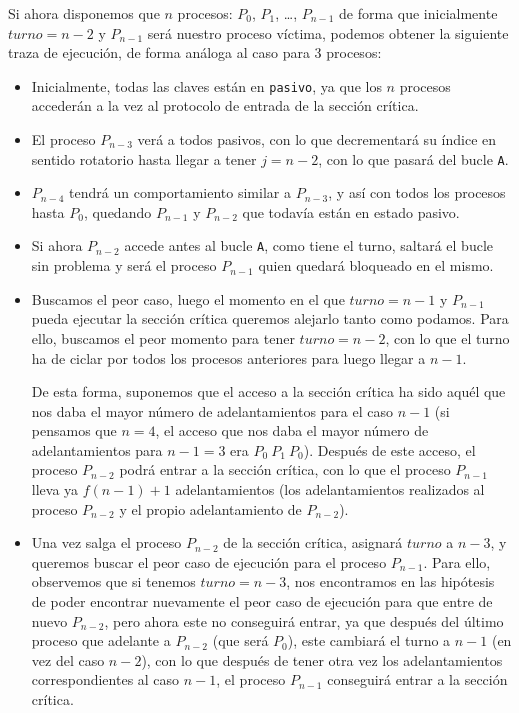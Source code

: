 \begin{description}
        Si ahora disponemos que $n$ procesos: $P_0$, $P_1$, \ldots, $P_{n-1}$ de forma que inicialmente $turno = n-2$ y $P_{n-1}$ será nuestro proceso víctima, podemos obtener la siguiente traza de ejecución, de forma análoga al caso para 3 procesos:
        \begin{itemize}
            \item Inicialmente, todas las claves están en \verb|pasivo|, ya que los $n$ procesos accederán a la vez al protocolo de entrada de la sección crítica.
            \item El proceso $P_{n-3}$ verá a todos pasivos, con lo que decrementará su índice en sentido rotatorio hasta llegar a tener $j = n-2$, con lo que pasará del bucle \verb|A|.
            \item $P_{n-4}$ tendrá un comportamiento similar a $P_{n-3}$, y así con todos los procesos hasta $P_0$, quedando $P_{n-1}$ y $P_{n-2}$ que todavía están en estado pasivo.
            \item Si ahora $P_{n-2}$ accede antes al bucle \verb|A|, como tiene el turno, saltará el bucle sin problema y será el proceso $P_{n-1}$ quien quedará bloqueado en el mismo.
            \item Buscamos el peor caso, luego el momento en el que $turno = n-1$ y $P_{n-1}$ pueda ejecutar la sección crítica queremos alejarlo tanto como podamos. Para ello, buscamos el peor momento para tener $turno = n-2$, con lo que el turno ha de ciclar por todos los procesos anteriores para luego llegar a $n-1$.

                De esta forma, suponemos que el acceso a la sección crítica ha sido aquél que nos daba el mayor número de adelantamientos para el caso $n-1$ (si pensamos que $n=4$, el acceso que nos daba el mayor número de adelantamientos para $n-1=3$ era $P_0\ P_1\ P_0$). Después de este acceso, el proceso $P_{n-2}$ podrá entrar a la sección crítica, con lo que el proceso $P_{n-1}$ lleva ya $f(n-1)+1$ adelantamientos (los adelantamientos realizados al proceso $P_{n-2}$ y el propio adelantamiento de $P_{n-2}$).
            \item Una vez salga el proceso $P_{n-2}$ de la sección crítica, asignará $turno$ a $n-3$, y queremos buscar el peor caso de ejecución para el proceso $P_{n-1}$. Para ello, observemos que si tenemos $turno = n-3$, nos encontramos en las hipótesis de poder encontrar nuevamente el peor caso de ejecución para que entre de nuevo $P_{n-2}$, pero ahora este no conseguirá entrar, ya que después del último proceso que adelante a $P_{n-2}$ (que será $P_0$), este cambiará el turno a $n-1$ (en vez del caso $n-2$), con lo que después de tener otra vez los adelantamientos correspondientes al caso $n-1$, el proceso $P_{n-1}$ conseguirá entrar a la sección crítica. 


\end{itemize}
\end{description}

